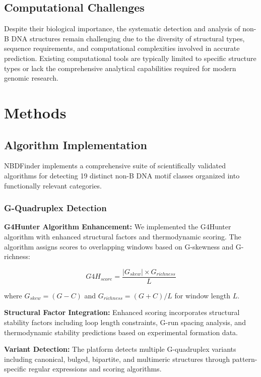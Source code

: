 \documentclass[twocolumn,letterpaper]{article}
\begin{document}
\subsection{Computational Challenges}

Despite their biological importance, the systematic detection and analysis of non-B DNA structures remain challenging due to the diversity of structural types, sequence requirements, and computational complexities involved in accurate prediction. Existing computational tools are typically limited to specific structure types or lack the comprehensive analytical capabilities required for modern genomic research.

\section{Methods}

\subsection{Algorithm Implementation}

NBDFinder implements a comprehensive suite of scientifically validated algorithms for detecting 19 distinct non-B DNA motif classes organized into functionally relevant categories.

\subsubsection{G-Quadruplex Detection}

\textbf{G4Hunter Algorithm Enhancement:} We implemented the G4Hunter algorithm\cite{Bedrat2016} with enhanced structural factors and thermodynamic scoring. The algorithm assigns scores to overlapping windows based on G-skewness and G-richness:

\begin{equation}
G4H_{score} = \frac{|G_{skew}| \times G_{richness}}{L}
\end{equation}

where $G_{skew} = (G-C)$ and $G_{richness} = (G+C)/L$ for window length $L$.

\textbf{Structural Factor Integration:} Enhanced scoring incorporates structural stability factors including loop length constraints, G-run spacing analysis, and thermodynamic stability predictions based on experimental formation data.

\textbf{Variant Detection:} The platform detects multiple G-quadruplex variants including canonical, bulged, bipartite, and multimeric structures through pattern-specific regular expressions and scoring algorithms.
\end{document}
